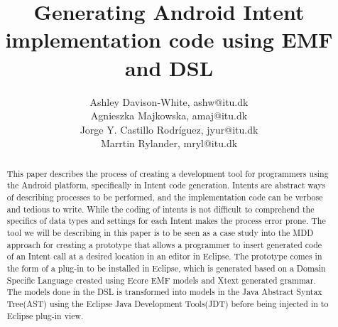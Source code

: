 \documentclass[10pt]{article}
\title{Generating Android Intent implementation code using EMF and DSL}
\author{Ashley Davison-White, ashw@itu.dk 
        \\Agnieszka Majkowska, amaj@itu.dk
        \\Jorge Y. Castillo Rodríguez, jyur@itu.dk
        \\Marrtin Rylander, mryl@itu.dk
}
\begin{document}
\maketitle

\begin{abstract}
This paper describes the process of creating a development tool for programmers using the Android platform, specifically in Intent code generation.
Intents are abstract ways of describing processes to be performed, and the implementation code can be verbose and tedious to write. While the coding of intents is not difficult to comprehend the specifics of data types and settings for each Intent makes the process error prone. The tool we will be describing in this paper is to be seen as a case study into the MDD approach for creating a prototype that allows a programmer to insert generated code of an Intent call at a desired location in an editor in Eclipse. The prototype comes in the form of a plug-in to be installed in Eclipse, which is generated based on a Domain Specific Language created using Ecore EMF models and Xtext generated grammar.
The models done in the DSL is transformed into models in the Java Abstract Syntax Tree(AST) using the Eclipse Java Development Tools(JDT) before being injected in to Eclipse plug-in view.   
\end{abstract}



















\setlength{\bibsep}{0.0pt}


\end{document}
